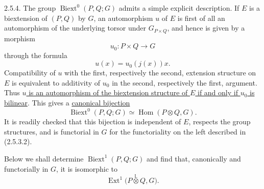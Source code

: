 2.5.4. The group $\operatorname{Biext}^{0}(P,Q;G)$ admits a simple
explicit description. If $E$ is a biextension of $(P,Q)$ by $G$, an
automorphism $u$ of $E$ is first of all an automorphism of the
underlying torsor under $G_{P\times Q}$, and hence is given by a
morphism
\[
 u_0:P\times Q\longrightarrow G
\]
through the formula
\[
 u(x)=u_0(j(x))x.
\]
Compatibility of $u$ with the first, respectively the second,
extension structure on $E$ is equivalent to additivity of $u_0$ in
the second, respectively the first, argument. Thus
\underline{$u$ is an automorphism of the biextension structure of $E$
if and only if $u_0$ is bilinear}. This gives a
\underline{canonical bijection}
\begin{equation}\tag{2.5.4.1}
 \operatorname{Biext}^{0}(P,Q;G)
 \simeq
 \operatorname{Hom}(P\otimes Q,G).
\end{equation}
It is readily checked that this bijection is independent of $E$,
respects the group structures, and is functorial in $G$ for the
functoriality on the left described in (2.5.3.2).

Below we shall determine $\operatorname{Biext}^{1}(P,Q;G)$ and find
that, canonically and functorially in $G$, it is isomorphic to
\[
 \operatorname{Ext}^{1}
 \bigl(P\overset{\mathbb L}{\otimes}Q,G\bigr).
\]

